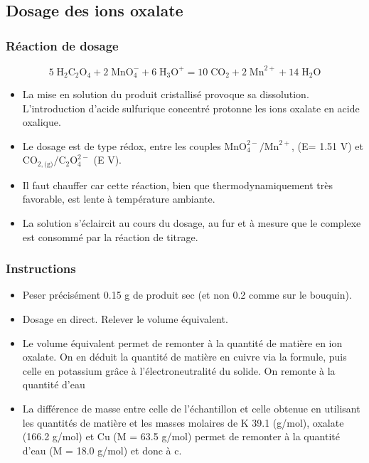 \documentclass[11pt,a4paper]{report}
\begin{document}
\subsection{Dosage des ions oxalate}

\subsubsection*{Réaction de dosage}
\begin{equation}
	5\;\text{H}_2\text{C}_2\text{O}_4 + 2\;\text{MnO}_4^- + 6\;\text{H}_3\text{O}^+
	= 10\;\text{CO}_2 + 2\;\text{Mn}^{2+} + 14\;\text{H}_2\text{O}
\end{equation}

\begin{itemize}
	\item La mise en solution du produit cristallisé provoque sa dissolution. L'introduction 			d'acide sulfurique concentré protonne les ions oxalate en acide oxalique.
	\item Le dosage est de type rédox, entre les couples $\text{MnO}_4^{2-}/\text{Mn}^{2+}$, 
	(E\degree = 1.51 V) et $\text{CO}_{2,\text{(g)}}/\text{C}_2\text{O}_4^{2-}$ (E V).
	\item Il faut chauffer car cette réaction, bien que thermodynamiquement très favorable, est 		lente à température ambiante.
	\item La solution s'éclaircit au cours du dosage, au fur et à mesure que le complexe est 			consommé par la réaction de titrage.
\end{itemize}	

\subsubsection*{Instructions}
\begin{itemize}
	\item Peser précisément 0.15 g de produit sec (et non 0.2 comme sur le bouquin).
	\item Dosage en direct. Relever le volume équivalent.
	\item Le volume équivalent permet de remonter à la quantité de matière en ion oxalate. On en 		déduit la quantité de matière en cuivre via la formule, puis celle en potassium grâce à 			l'électroneutralité du solide. On remonte à la quantité d'eau
	\item La différence de masse entre celle de l'échantillon et celle obtenue en utilisant les 		quantités de matière et les masses molaires de K 39.1 (g/mol), oxalate (166.2 g/mol) 
	et Cu (M = 63.5 g/mol) permet de remonter à la quantité d'eau (M = 18.0 g/mol) et donc à c.
\end{itemize}
\end{document}
